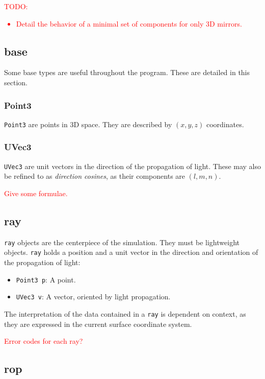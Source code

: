\textcolor{red}{TODO: \begin{itemize}
\item Detail the behavior of a minimal set of components for
only 3D mirrors.
\end{itemize}}

\subsection{base}
Some base types are useful throughout the program. These are detailed in this
section.

\subsubsection{Point3}
\lstinline{Point3} are points in 3D space. They are described by $(x, y, z)$
coordinates.

\subsubsection{UVec3}
\lstinline{UVec3} are unit vectors in the direction of the propagation
of light. These may also be refined to as \emph{direction cosines},
as their components are $(l, m, n)$.

\textcolor{red}{Give some formulae.}

\subsection{ray}
\lstinline{ray} objects are the centerpiece of the simulation. They must be
lightweight objects.  \lstinline{ray} holds a position and a unit vector in the
direction and orientation of the propagation of light:

\begin{itemize}
\item \lstinline{Point3 p}: A point.
\item \lstinline{UVec3 v}: A vector, oriented by light propagation.
\end{itemize}

The interpretation of the data contained in a \lstinline{ray} is dependent
on context, as they are expressed in the current surface coordinate system.

\textcolor{red}{Error codes for each ray?}

\subsection{rop}

